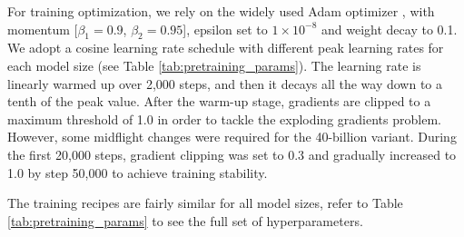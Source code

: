 For training optimization, we rely on the widely used Adam optimizer \cite{adam_original, adam}, with momentum [$\beta_1 = 0.9$, $\beta_2 = 0.95$], epsilon set to $1 \times 10^{-8}$ and weight decay to 0.1. We adopt a cosine learning rate schedule with different peak learning rates for each model size (see Table \ref{tab:pretraining_params}). The learning rate is linearly warmed up over 2,000 steps, and then it decays all the way down to a tenth of the peak value. After the warm-up stage, gradients are clipped to a maximum threshold of 1.0 in order to tackle the exploding gradients problem. However, some midflight changes were required for the 40-billion variant. During the first 20,000 steps, gradient clipping was set to 0.3 and gradually increased to 1.0 by step 50,000 to achieve training stability.

The training recipes are fairly similar for all model sizes, refer to Table \ref{tab:pretraining_params} to see the full set of hyperparameters.

